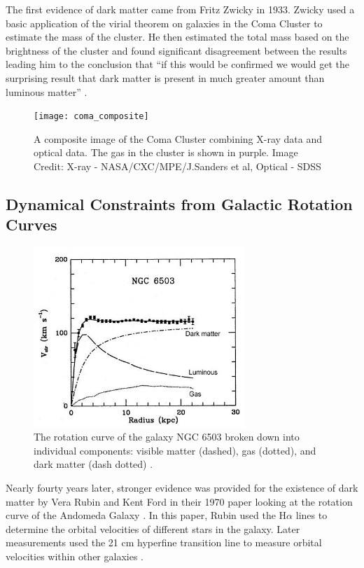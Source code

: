 The first evidence of dark matter came from Fritz Zwicky in 1933.  Zwicky used a basic application of the virial theorem on galaxies in the Coma Cluster	to estimate the mass of the cluster.  He then  estimated the total mass based on the brightness of the cluster and found significant disagreement between the results leading him to the conclusion that ``if this would be confirmed we would get the surprising result that dark matter is present in much greater amount than luminous matter'' \cite{Zwicky1933}.
	
\begin{figure}[h]
\texttt{[image: coma\_composite]}
\centering
\caption{A composite image of the Coma Cluster combining X-ray data and optical data.  The gas in the cluster is shown in purple.  Image Credit: X-ray - NASA/CXC/MPE/J.Sanders et al, Optical - SDSS}
\end{figure}
	
	
\subsection{Dynamical Constraints from Galactic Rotation Curves}	
	


\begin{figure}[b]
	\centering
	\includegraphics[width=8cm]{ngc_6503_rotation_curve}
	\caption{The rotation curve of the galaxy NGC 6503 broken down into individual components: visible matter (dashed), gas (dotted), and dark matter (dash dotted) \cite{Begeman1991}. }
	\label{fig:galactic_rotation_curve}
\end{figure}

	
Nearly fourty years later, stronger evidence was provided for the existence of dark matter by Vera Rubin and Kent Ford in their 1970 paper looking at the rotation curve of the Andomeda Galaxy \cite{rubin1970rotation}.  In this paper, Rubin used the H$\alpha$ lines to determine the orbital velocities of different stars in the galaxy.  Later measurements used the 21 cm hyperfine transition line to measure orbital velocities within other galaxies \cite{Begeman1991}.
	
